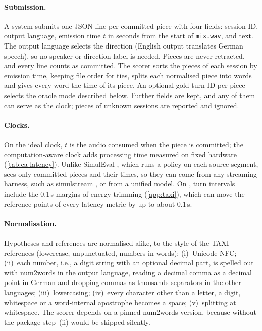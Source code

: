 \paragraph{Submission.}
A system submits one JSON line per committed piece with four fields: session ID, output language, emission time $t$ in seconds from the start of \texttt{mix.wav}, and text. The output language selects the direction (English output translates German speech), so no speaker or direction label is needed. Pieces are never retracted, and every line counts as committed. The scorer sorts the pieces of each session by emission time, keeping file order for ties, splits each normalised piece into words and gives every word the time of its piece. An optional gold turn ID per piece selects the oracle mode described below. Further fields are kept, and any of them can serve as the clock; pieces of unknown sessions are reported and ignored.

\paragraph{Clocks.}
On the ideal clock, $t$ is the audio consumed when the piece is committed; the computation-aware clock \citep{ma2020simulmt} adds processing time measured on fixed hardware (\cref{tab:ca-latency}). Unlike SimulEval \citep{ma2020simuleval}, which runs a policy on each source segment, \scorer sees only committed pieces and their times, so they can come from any streaming harness, such as simulstream \citep{gaido2025simulstream}, or from a unified model. On \taxi, turn intervals include the 0.1\,s margins of energy trimming (\cref{app:taxi}), which can move the reference points of every latency metric by up to about 0.1\,s.

\paragraph{Normalisation.}
Hypotheses and references are normalised alike, to the style of the TAXI references (lowercase, unpunctuated, numbers in words): (i)~Unicode NFC; (ii)~each number, i.e., a digit string with an optional decimal part, is spelled out with num2words in the output language, reading a decimal comma as a decimal point in German and dropping commas as thousands separators in the other languages; (iii)~lowercasing; (iv)~every character other than a letter, a digit, whitespace or a word-internal apostrophe becomes a space; (v)~splitting at whitespace. The scorer depends on a pinned num2words version, because without the package step~(ii) would be skipped silently.

